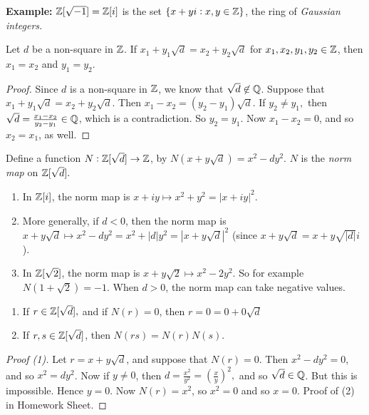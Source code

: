 \documentclass[10pt]{scrartcl}
\begin{document}
 \textbf{Example:} $\mathbb{Z}[\sqrt{-1}] = \mathbb{Z}[i]$ is the set $\{x + yi : x,y \in \mathbb{Z}\}$, the ring of \emph{Gaussian integers.}\\

\begin{proposition} Let $d$ be a non-square in $\mathbb{Z}$. If $x_1 + y_1\sqrt{d} = x_2 + y_2\sqrt{d}$ for $x_1, x_2, y_1, y_2 \in \mathbb{Z}$, then $x_1 = x_2$ and $y_1 = y_2$.	
\end{proposition}

\begin{proof}
Since $d$ is a non-square in $\mathbb{Z}$, we know that $\sqrt{d} \not\in \mathbb{Q}$. Suppose that $x_1 + y_1\sqrt{d} = x_2 + y_2\sqrt{d}$. Then $x_1 - x_2 = (y_2 - y_1)\sqrt{d}$. If $y_2 \neq y_1,$ then $\sqrt{d} = \frac{x_1 - x_2}{y_2 - y_1} \in \mathbb{Q}$, which is a contradiction. So $y_2 = y_1$. Now $x_1 -x_2 = 0$, and so $x_2 = x_1$, as well. 	
\end{proof}\vspace*{5pt}

\begin{definition} Define a function $N: \mathbb{Z}[\sqrt{d}] \to \mathbb{Z}$, by $N(x + y\sqrt{d}) = x^2 - dy^2.$ $N$ is the \emph{norm map} on $\mathbb{Z}[\sqrt{d}].$	
\end{definition}\vspace*{10pt}

\begin{examples}\begin{enumerate}
\item In $\mathbb{Z}[i]$, the norm map is $x + iy \mapsto x^2 + y^2 = |x + iy|^2$.
\item More generally, if $d < 0$, then the norm map is $x+ y\sqrt{d} \mapsto x^2 - dy^2 = x^2 + |d|y^2 = |x + y\sqrt{d}|^2$ (since $x + y\sqrt{d} = x+y\sqrt{|d|}i$).
\item In $\mathbb{Z}[\sqrt{2}]$, the norm map is $x + y\sqrt{2} \mapsto x^2 - 2y^2$. So for example $N(1 + \sqrt{2}) = -1$. When $d > 0$, the norm map can take negative values.
 \end{enumerate}\end{examples}\vspace*{10pt}
 
\begin{proposition}\begin{enumerate}
 \item If $r \in \mathbb{Z}[\sqrt{d}],$ and if $N(r) = 0$, then $r = 0 = 0 + 0\sqrt{d}$
 \item 	If $r,s \in \mathbb{Z}[\sqrt{d}]$, then $N(rs) = N(r)N(s)$.
 \end{enumerate}\end{proposition}
\begin{proof} [Proof (1)] 
Let $r = x + y\sqrt{d}$, and suppose that $N(r) = 0$. Then $x^2 - dy^2 = 0$, and so $x^2 = dy^2$. Now if $y \neq 0$, then $d =\frac{x^2}{y^2} = \left(\frac{x}{y}\right)^2,$ and so $\sqrt{d} \in \mathbb{Q}$. But this is impossible. Hence $y = 0$. Now $N(r) = x^2$, so $x^2 = 0$ and so $x = 0$. Proof of (2) in Homework Sheet.
\end{proof}\vspace*{5pt}
\end{document}
